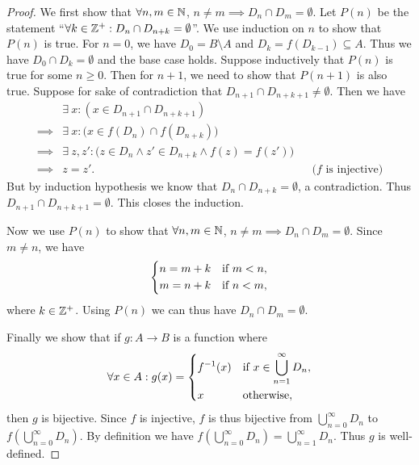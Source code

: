 \begin{proof}
  We first show that \(\forall n, m \in \mathbb{N}\), \(n \neq m \implies D_n \cap D_m = \emptyset\).
  Let \(P(n)\) be the statement ``\(\forall k \in \mathbb{Z}^+ : D_n \cap D_{n + k} = \emptyset\)''.
  We use induction on \(n\) to show that \(P(n)\) is true.
  For \(n = 0\), we have \(D_0 = B \setminus A\) and \(D_k = f(D_{k - 1}) \subseteq A\).
  Thus we have \(D_0 \cap D_k = \emptyset\) and the base case holds.
  Suppose inductively that \(P(n)\) is true for some \(n \geq 0\).
  Then for \(n + 1\), we need to show that \(P(n + 1)\) is also true.
  Suppose for sake of contradiction that \(D_{n + 1} \cap D_{n + k + 1} \neq \emptyset\).
  Then we have
  \begin{align*}
             & \exists\ x : (x \in D_{n + 1} \cap D_{n + k + 1})                                                               \\
    \implies & \exists\ x : \big(x \in f(D_n) \cap f(D_{n + k})\big)                                                           \\
    \implies & \exists\ z, z' : \big(z \in D_n \land z' \in D_{n + k} \land f(z) = f(z')\big)                                  \\
    \implies & z = z'.                                                                        &  & \text{(\(f\) is injective)}
  \end{align*}
  But by induction hypothesis we know that \(D_n \cap D_{n + k} = \emptyset\), a contradiction.
  Thus \(D_{n + 1} \cap D_{n + k + 1} = \emptyset\).
  This closes the induction.

  Now we use \(P(n)\) to show that \(\forall n, m \in \mathbb{N}\), \(n \neq m \implies D_n \cap D_m = \emptyset\).
  Since \(m \neq n\), we have
  \[
    \begin{dcases}
      n = m + k & \text{if } m < n, \\
      m = n + k & \text{if } n < m,
    \end{dcases}
  \]
  where \(k \in \mathbb{Z}^+\).
  Using \(P(n)\) we can thus have \(D_n \cap D_m = \emptyset\).

  Finally we show that if \(g : A \to B\) is a function where
  \[
    \forall x \in A : g(x) = \begin{dcases}
      f^{-1}(x) & \text{if } x \in \bigcup_{n = 1}^\infty D_n, \\
      x         & \text{otherwise},
    \end{dcases}
  \]
  then \(g\) is bijective.
  Since \(f\) is injective, \(f\) is thus bijective from \(\bigcup_{n = 0}^\infty D_n\) to \(f(\bigcup_{n = 0}^\infty D_n)\).
  By definition we have \(f(\bigcup_{n = 0}^\infty D_n) = \bigcup_{n = 1}^\infty D_n\).
  Thus \(g\) is well-defined.


\end{proof}
